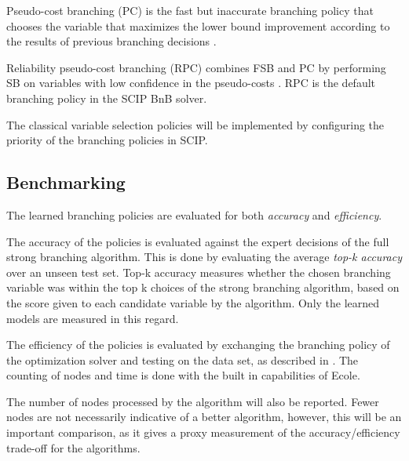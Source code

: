 Pseudo-cost branching (\gls{PC}) is the fast but inaccurate branching policy \cite{gamrath2018measuring} that chooses the variable that maximizes the lower bound improvement according to the results of previous branching decisions \cite{benchiou1971experiments}.%

Reliability pseudo-cost branching (\gls{RPC}) \cite{achterberg2004branching} combines \gls{FSB} and \gls{PC} by performing \gls{SB} on variables with low confidence in the pseudo-costs \cite{gamrath2018measuring}. \gls{RPC} is the default branching policy in the \gls{SCIP} \gls{BnB} solver. 

The classical variable selection policies will be implemented by configuring the priority of the branching policies in \gls{SCIP}. 


\subsection{Benchmarking}\label{ssec:benchmarking}

The learned branching policies are evaluated for both \textit{accuracy} and \textit{efficiency}. 

The accuracy of the policies is evaluated against the expert decisions of the full strong branching algorithm. This is done by evaluating the average \textit{top-k accuracy} over an unseen test set. Top-k accuracy measures whether the chosen branching variable was within the top k choices of the strong branching algorithm, based on the score given to each candidate variable by the algorithm. Only the learned models are measured in this regard. 

The efficiency of the policies is evaluated by exchanging the branching policy of the optimization solver and testing on the data set, as described in . The counting of nodes and time is done with the built in capabilities of \gls{Ecole}. %

The number of nodes processed by the algorithm will also be reported. Fewer nodes are not necessarily indicative of a better algorithm, however, this will be an important comparison, as it gives a proxy measurement of the accuracy/efficiency trade-off for the algorithms. 






